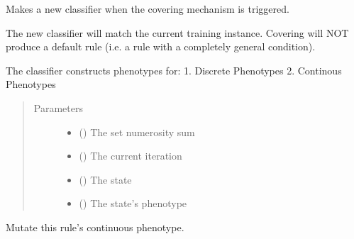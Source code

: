 \documentclass[letterpaper,10pt,english]{sphinxmanual}
\begin{document}
\begin{fulllineitems}
\begin{fulllineitems}
\label{\detokenize{eLCS:eLCS.Classifier.Classifier.classifierCovering}}
Makes a new classifier when the covering mechanism is triggered.

The new classifier will match the current training instance.
Covering will NOT produce a default rule (i.e. a rule with a completely general condition).

The classifier constructs phenotypes for:
1.  Discrete Phenotypes
2.  Continous Phenotypes
\begin{quote}\begin{description}
\item[{Parameters}] \leavevmode\begin{itemize}
\item {} 
 () \textendash{} The set numerosity sum

\item {} 
 () \textendash{} The current iteration

\item {} 
 () \textendash{} The state

\item {} 
 () \textendash{} The state’s phenotype

\end{itemize}

\end{description}\end{quote}

\end{fulllineitems}


\begin{fulllineitems}
\label{\detokenize{eLCS:eLCS.Classifier.Classifier.continuousPhenotypeMutation}}
Mutate this rule’s continuous phenotype.

\end{fulllineitems}



\end{fulllineitems}
\end{document}
